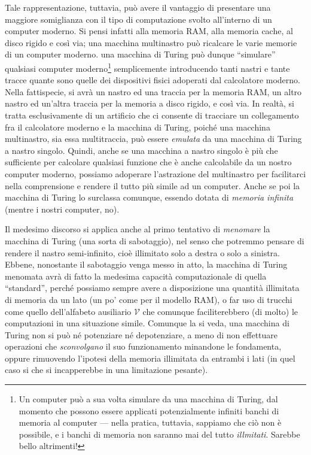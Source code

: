 \documentclass[10pt]{\classname}
\theoremstyle{definition}
\theoremstyle{definition}
\begin{document}
Tale rappresentazione, tuttavia, può avere il vantaggio di presentare una
maggiore somiglianza con il tipo di computazione svolto all'interno di un
computer moderno. Si pensi infatti alla memoria RAM, alla memoria cache, al
disco rigido e così via; una macchina multinastro può ricalcare le varie memorie di un computer moderno. una macchina di Turing può dunque ``simulare''
qualsiasi computer moderno\footnote{Un computer può a sua volta simulare da una
macchina di Turing, dal momento che possono essere applicati potenzialmente
infiniti banchi di memoria al computer --- nella pratica, tuttavia, sappiamo
che ciò non è possibile, e i banchi di memoria non saranno mai del tutto
\emph{illmitati}. Sarebbe bello altrimenti!} semplicemente introducendo tanti nastri e tante tracce quante
sono quelle dei dispositivi fisici adoperati dal calcolatore moderno. Nella
fattispecie, si avrà un nastro ed una traccia per la memoria RAM, un altro
nastro ed un'altra traccia per la memoria a disco rigido, e così via. In
realtà, si tratta esclusivamente di un artificio che ci consente di tracciare
un collegamento fra il calcolatore moderno e la macchina di Turing, poiché una
macchina multinastro, sia essa multitraccia, può essere \emph{emulata} da una
macchina di Turing a nastro singolo. Quindi, anche se una macchina a nastro
singolo è più che sufficiente per calcolare qualsiasi funzione che è anche
calcolabile da un nostro computer moderno, possiamo adoperare l'astrazione del
multinastro per facilitarci nella comprensione e rendere il tutto più simile ad
un computer. Anche se poi la macchina di Turing lo surclassa comunque, essendo
dotata di \emph{memoria infinita} (mentre i nostri computer, no).

Il medesimo discorso si applica anche al primo tentativo di \emph{menomare} la
macchina di Turing (una sorta di sabotaggio), nel senso che potremmo pensare di
rendere il nastro semi-infinito, cioè illimitato solo a destra o solo a
sinistra. Ebbene, nonostante il sabotaggio venga messo in atto,
la macchina di Turing menomata avrà di fatto la medesima capacità
computazionale di quella ``standard'', perché possiamo sempre avere a
disposizione una quantità illimitata di memoria da un lato (un po' come per il
modello RAM), o far uso di trucchi come quello dell'alfabeto ausiliario
$\mathcal V$ che comunque faciliterebbero (di molto) le computazioni in una situazione
simile. Comunque la si veda, una macchina di Turing non si può né potenziare né
depotenziare, a meno di non effettuare operazioni che \emph{sconvolgano} il suo
funzionamento minandone le fondamenta, oppure rimuovendo l'ipotesi della
memoria illimitata da entrambi i lati (in quel caso si che si incapperebbe in
una limitazione pesante).
\end{document}

